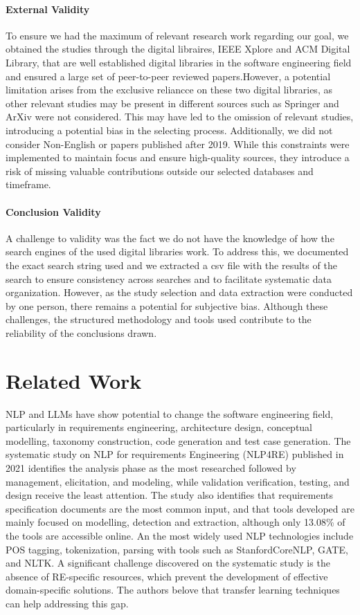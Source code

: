\paragraph{External Validity}
To ensure we had the maximum of relevant research work regarding our goal, we obtained the studies through the digital libraires, IEEE Xplore and ACM Digital Library, that are well established digital libraries in the software engineering field and ensured a large set of peer-to-peer reviewed papers.However, a potential limitation arises from the exclusive reliancce on these two digital libraries, as other relevant studies may be present in different sources such as Springer and ArXiv were not considered. This may have led to the omission of relevant studies, introducing a potential bias in the selecting process.
Additionally, we did not consider Non-English or papers published after 2019. While this constraints were implemented to maintain focus and ensure high-quality sources, they introduce a risk of missing valuable contributions outside our selected databases and timeframe. 

\paragraph{Conclusion Validity}
A challenge to validity was the fact we do not have the knowledge of how the search engines of the used digital libraries work. To address this, we documented the exact search string used and we extracted a csv file with the results of the search to ensure consistency across searches and to facilitate systematic data organization. However, as the study selection and data extraction were conducted by one person, there remains a potential for subjective bias. 
Although these challenges, the structured methodology and tools used contribute to the reliability of the conclusions drawn.

\section{Related Work} %
\label{sec:related_work}
NLP and LLMs have show potential to change the software engineering field, particularly in requirements engineering, architecture design, conceptual modelling, taxonomy construction, code generation and test case generation. 
The systematic study on NLP for requirements Engineering (NLP4RE) \cite{22Zhao} published in 2021 identifies the analysis phase as the most researched followed by management, elicitation, and modeling, while validation verification, testing, and design receive the least attention. The study also identifies that requirements specification documents are the most common input, and that tools developed are mainly focused on modelling, detection and extraction, although only 13.08\% of the tools are accessible online. An the most widely used NLP technologies include POS tagging, tokenization, parsing with tools such as StanfordCoreNLP, GATE, and NLTK.
A significant challenge discovered on the systematic study is the absence of RE-specific resources, which prevent the development of effective domain-specific solutions. The authors belove that transfer learning techniques can help addressing this gap.

